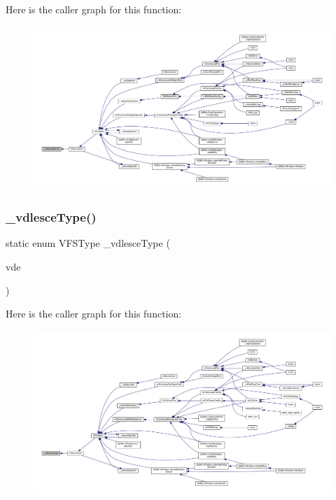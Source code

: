 Here is the caller graph for this function\+:
\nopagebreak
\begin{figure}[H]
\begin{center}
\leavevmode
\includegraphics[width=350pt]{sce-vfs_8c_ae3b351bf034b273f767968418e12954d_icgraph}
\end{center}
\end{figure}
\mbox{\label{sce-vfs_8c_a722290117273ac55b2ebd5709d2319e0}} 
\subsubsection{\texorpdfstring{\+\_\+vdlesce\+Type()}{\_vdlesceType()}}
{\footnotesize\ttfamily static enum V\+F\+S\+Type \+\_\+vdlesce\+Type (\begin{DoxyParamCaption}\item[{struct V\+Dir\+Entry $\ast$}]{vde }\end{DoxyParamCaption})\hspace{0.3cm}{\ttfamily [static]}}

Here is the caller graph for this function\+:
\nopagebreak
\begin{figure}[H]
\begin{center}
\leavevmode
\includegraphics[width=350pt]{sce-vfs_8c_a722290117273ac55b2ebd5709d2319e0_icgraph}
\end{center}
\end{figure}
\mbox{\label{sce-vfs_8c_ab25e52aef2dda5c0b7a37e497275d1aa}} 
